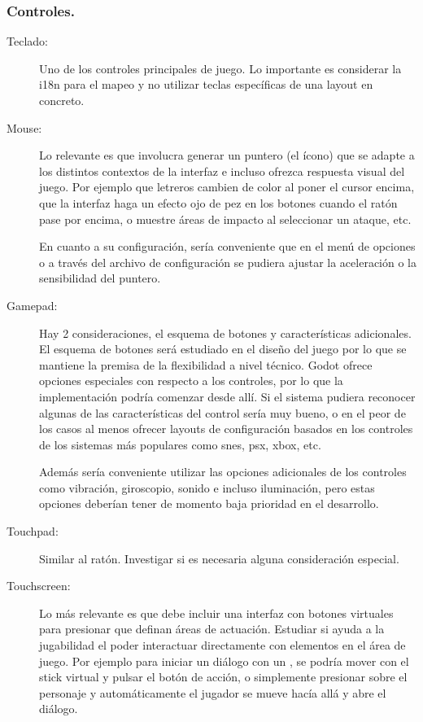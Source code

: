 \subsubsection{Controles.}
\begin{description}
\item[Teclado:] Uno de los controles principales de juego. Lo importante es considerar la i18n para el mapeo y no utilizar teclas específicas de una layout en concreto.

\item[Mouse:] Lo relevante es que involucra generar un puntero (el ícono) que se adapte a los distintos contextos de la interfaz e incluso ofrezca respuesta visual del juego. Por ejemplo que letreros cambien de color al poner el cursor encima, que la interfaz haga un efecto ojo de pez en los botones cuando el ratón pase por encima, o muestre áreas de impacto al seleccionar un ataque, etc.

En cuanto a su configuración, sería conveniente que en el menú de opciones o a través del archivo de configuración se pudiera ajustar la aceleración o la sensibilidad del puntero. 

\item[Gamepad:] Hay 2 consideraciones, el esquema de botones y características adicionales. El esquema de botones será estudiado en el diseño del juego por lo que se mantiene la premisa de la flexibilidad a nivel técnico. Godot ofrece opciones especiales con respecto a los controles, por lo que la implementación podría comenzar desde allí. Si el sistema pudiera reconocer algunas de las características del control sería muy bueno, o en el peor de los casos al menos ofrecer layouts de configuración basados en los controles de los sistemas más populares como snes, psx, xbox, etc.

Además sería conveniente utilizar las opciones adicionales de los controles como vibración, giroscopio, sonido e incluso iluminación, pero estas opciones deberían tener de momento baja prioridad en el desarrollo.

\item[Touchpad:] Similar al ratón. Investigar si es necesaria alguna consideración especial.

\item[Touchscreen:] Lo más relevante es que debe incluir una interfaz con botones virtuales para presionar que definan áreas de actuación. Estudiar si ayuda a la jugabilidad el poder interactuar directamente con elementos en el área de juego. Por ejemplo para iniciar un diálogo con un , se podría mover con el stick virtual y pulsar el botón de acción, o simplemente presionar sobre el personaje y automáticamente el jugador se mueve hacía allá y abre el diálogo.
\end{description}

